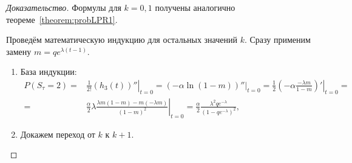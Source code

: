 \documentclass[12pt, specialist, subf, substylefile = spbu.rtx]{disser}
\begin{document}
	\begin{proof}[Доказательство]
		Формулы для $k = 0, 1$ получены аналогично теореме~\ref{theorem:probLPR1}.
		
		Проведём математическую индукцию для остальных значений $k$. Сразу применим замену $m = q e ^{\lambda(t - 1)}$.
		
		\begin{enumerate}
			\item База индукции:
			\[
				\begin{aligned}
					P (S _\tau = 2) =& \left.\frac 1 {2 !} \left(h _3(t)\right)''\right| _{t = 0} = \left.\left(-\alpha \ln \left(1 - m \right)\right)''\right| _{t = 0} = \left.\frac 1 2 \left(-\alpha \frac {-\lambda m} {1 - m}\right)' \right| _{t = 0} =\\
					=&  \left.\frac \alpha 2 \lambda \frac {\lambda m \left(1 - m\right) - m \left(-\lambda m\right)} {\left(1 - m\right) ^2}\right| _{t = 0} = \frac \alpha 2 \frac {\lambda ^2 q e ^{-\lambda}} {\left(1 - q e ^{-\lambda}\right) ^2},
				\end{aligned}
			\]
			
			\item Докажем переход от $k$ к $k + 1$.
			

\end{enumerate}
\end{proof}
\end{document}
